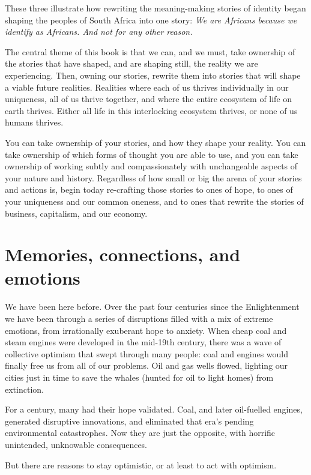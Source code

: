 These three illustrate how rewriting the meaning-making stories of identity began shaping the peoples of South Africa into one story: \emph{We are Africans because we identify as Africans. And not for any other reason.}


The central theme of this book is that we can, and we must, take ownership of the stories that have shaped, and are shaping still, the reality we are experiencing. Then, owning our stories, rewrite them into stories that will shape a viable future realities. Realities where each of us thrives individually in our uniqueness, all of us thrive together, and where the entire ecosystem of life on earth thrives. Either all life in this interlocking ecosystem thrives, or none of us humans thrives.


You can take ownership of your stories, and how they shape your reality. You can take ownership of which forms of thought you are able to use, and you can take ownership of working subtly and compassionately with unchangeable aspects of your nature and history. Regardless of how small or big the arena of your stories and actions is, begin today re-crafting those stories to ones of hope, to ones of your uniqueness and our common oneness, and to ones that rewrite the stories of business, capitalism, and our economy.


\section{Memories, connections, and emotions}
We have been here before. Over the past four centuries since the Enlightenment we have been through a series of disruptions filled with a mix of extreme emotions, from irrationally exuberant hope to anxiety. When cheap coal and steam engines were developed in the mid-19th century, there was a wave of collective optimism that swept through many people: coal and engines would finally free us from all of our problems. Oil and gas wells flowed, lighting our cities just in time to save the whales (hunted for oil to light homes) from extinction.


For a century, many had their hope validated. Coal, and later oil-fuelled engines, generated disruptive innovations, and eliminated that era’s pending environmental catastrophes. Now they are just the opposite, with horrific unintended, unknowable consequences.


But there are reasons to stay optimistic, or at least to act with optimism.


